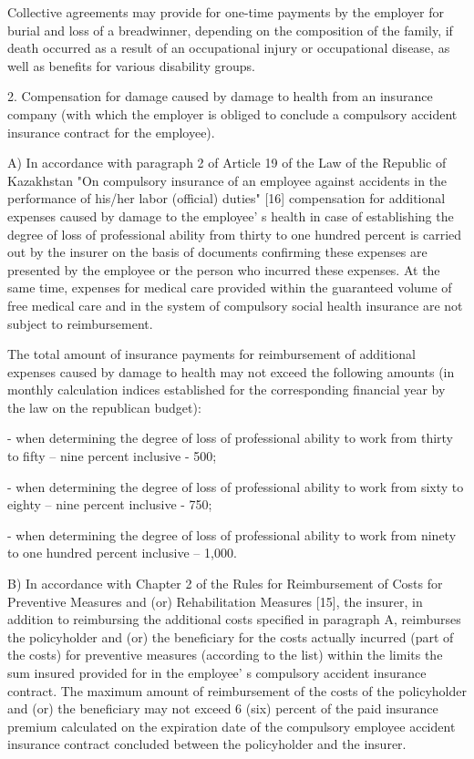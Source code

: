 \begin{multicols}{2}
Collective agreements may provide for one-time payments by the employer
for burial and loss of a breadwinner, depending on the composition of
the family, if death occurred as a result of an occupational injury or
occupational disease, as well as benefits for various disability groups.

2. Compensation for damage caused by damage to health from an insurance
company (with which the employer is obliged to conclude a compulsory
accident insurance contract for the employee).

A) In accordance with paragraph 2 of Article 19 of the Law of the
Republic of Kazakhstan "On compulsory insurance of an employee against
accidents in the performance of his/her labor (official) duties"
{[}16{]} compensation for additional expenses caused by damage to the
employee' s health in case of establishing the degree of
loss of professional ability from thirty to one hundred percent is
carried out by the insurer on the basis of documents confirming these
expenses are presented by the employee or the person who incurred these
expenses. At the same time, expenses for medical care provided within
the guaranteed volume of free medical care and in the system of
compulsory social health insurance are not subject to reimbursement.

The total amount of insurance payments for reimbursement of additional
expenses caused by damage to health may not exceed the following amounts
(in monthly calculation indices established for the corresponding
financial year by the law on the republican budget):

- when determining the degree of loss of professional ability to work
from thirty to fifty -- nine percent inclusive - 500;

- when determining the degree of loss of professional ability to work
from sixty to eighty -- nine percent inclusive - 750;

- when determining the degree of loss of professional ability to work
from ninety to one hundred percent inclusive -- 1,000.

B) In accordance with Chapter 2 of the Rules for Reimbursement of Costs
for Preventive Measures and (or) Rehabilitation Measures {[}15{]}, the
insurer, in addition to reimbursing the additional costs specified in
paragraph A, reimburses the policyholder and (or) the beneficiary for
the costs actually incurred (part of the costs) for preventive measures
(according to the list) within the limits the sum insured provided for
in the employee' s compulsory accident insurance
contract. The maximum amount of reimbursement of the costs of the
policyholder and (or) the beneficiary may not exceed 6 (six) percent of
the paid insurance premium calculated on the expiration date of the
compulsory employee accident insurance contract concluded between the
policyholder and the insurer.


\end{multicols}
